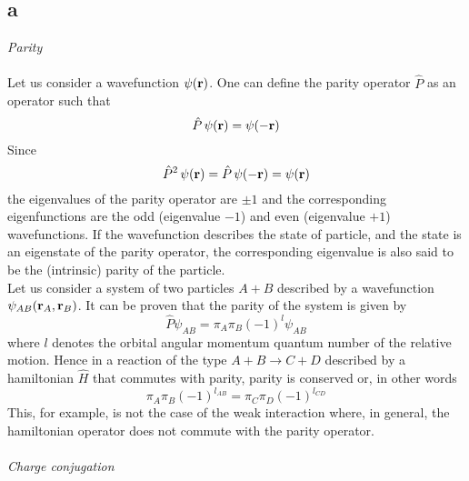 \subsection*{a} 
\vspace{10pt}
\emph{Parity} \\
\vspace{10pt} \\
Let us consider a wavefunction $\psi(\mathbf{r})$. One can define the parity operator $\hat P$ as an operator such that 
\begin{equation*}
    \hat P \, \psi(\mathbf{r}) = \psi(-\mathbf{r})
\end{equation*}
Since
\begin{equation}
    \hat P^2 \, \psi(\mathbf{r}) = \hat P \, \psi(-\mathbf{r}) = \psi(\mathbf{r})
    \label{eq:eigenvalue_equation_parity}
\end{equation}
the eigenvalues of the parity operator are $\pm 1$ and the corresponding eigenfunctions are the odd (eigenvalue $-1$) and even (eigenvalue $+1$) wavefunctions. If the wavefunction
describes the state of particle, and the state is an eigenstate of the parity operator, the corresponding eigenvalue is also said to be the (intrinsic) parity of the particle. \\
Let us consider a system of two particles $A+B$ described by a wavefunction $\psi_{AB}(\mathbf{r}_A, \mathbf{r}_B)$. It can be proven that the parity of the system is given by 
\begin{equation*}
    \hat P \psi_{AB} = \pi_A \pi_B (-1)^l \psi_{AB}
\end{equation*}
where $l$ denotes the orbital angular momentum quantum number of the relative motion. Hence in a reaction of the type $A+B \rightarrow C+D$ described by a hamiltonian $\hat H$ that commutes with parity,
parity is conserved or, in other words
\begin{equation*}
    \pi_A \pi_B (-1)^{l_{AB}} = \pi_C \pi_D (-1)^{l_{CD}} 
\end{equation*}
This, for example, is not the case of the weak interaction where, in general, the hamiltonian operator does not commute with the parity operator. \\
\vspace{10pt} \\
\emph{Charge conjugation} 
\vspace{10pt} 

